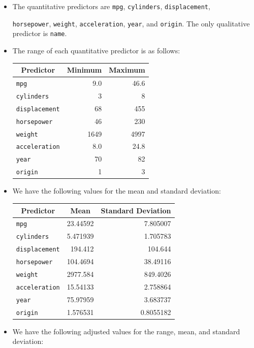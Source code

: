 \begin{itemize}
    \item[(a)] The quantitative predictors are \verb|mpg|, \verb|cylinders|,
        \verb|displacement|, \par \verb|horsepower|, \verb|weight|,
        \verb|acceleration|,
        \verb|year|, and \verb|origin|. The only qualitative predictor is
        \verb|name|.
    \item[(b)] The range of each quantitative predictor is as follows:
        \begin{center}
            \begin{tabular}{ l | r | r }
                \multicolumn{1}{c}{Predictor} & \multicolumn{1}{c}{Minimum}
                & \multicolumn{1}{c}{Maximum} \\
                \hline
                \verb|mpg| & 9.0 & 46.6 \\
                \verb|cylinders| & 3 & 8 \\
                \verb|displacement| & 68 & 455 \\
                \verb|horsepower| & 46 & 230 \\
                \verb|weight| & 1649 & 4997 \\
                \verb|acceleration| & 8.0 & 24.8 \\
                \verb|year| & 70 & 82 \\
                \verb|origin| & 1 & 3
            \end{tabular}
        \end{center}
    \item[(c)] We have the following values for the mean and standard deviation:
        \begin{center}
            \begin{tabular}{ l | r | r }
                \multicolumn{1}{c}{Predictor} & \multicolumn{1}{c}{Mean}
                & \multicolumn{1}{c}{Standard Deviation} \\
                \hline
                \verb|mpg| & 23.44592 & 7.805007 \\
                \verb|cylinders| & 5.471939 & 1.705783 \\
                \verb|displacement| & 194.412 & 104.644 \\
                \verb|horsepower| & 104.4694 & 38.49116 \\
                \verb|weight| & 2977.584 & 849.4026 \\
                \verb|acceleration| & 15.54133 & 2.758864 \\
                \verb|year| & 75.97959 & 3.683737 \\
                \verb|origin| & 1.576531 & 0.8055182
            \end{tabular}
        \end{center}
    \item[(d)] We have the following adjusted values for the range, mean, and
        standard deviation:


\end{itemize}

